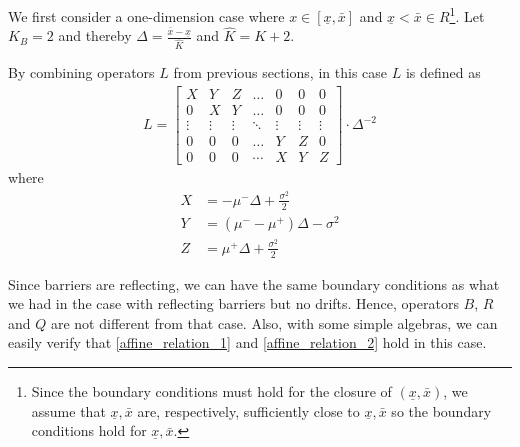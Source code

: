 \documentclass[11pt]{article}
\begin{document}
We first consider a one-dimension case where $x\in [\underline{\textit{\~{x}}}, \bar{\textit{\~{x}}}]$ and $\underline{\textit{\~{x}}} < \bar{\textit{\~{x}}} \in R$\footnote{Since the boundary conditions must hold for the closure of $(\underline{x},\bar{x})$, we assume that $\underline{\textit{\~{x}}}, \bar{\textit{\~{x}}}$ are, respectively, sufficiently close to $\underline{x}, \bar{x}$ so the boundary conditions hold for $\underline{\textit{\~{x}}}, \bar{\textit{\~{x}}}$.}. Let $K_B = 2$ and thereby $\Delta  = \frac{\bar{\textit{\~{x}}} - \underline{\textit{\~{x}}}}{\hat{K}}$ and $\hat{K} = K+2$. 

By combining operators $L$ from previous sections, in this case $L$ is defined as
\begin{align}
L = \begin{bmatrix}
X&Y&Z&\dots&0&0&0\\
0&X&Y&\dots&0&0&0\\
\vdots&\vdots&\vdots&\ddots&\vdots&\vdots&\vdots\\
0&0&0&\dots&Y&Z&0\\
0&0&0&\cdots&X&Y&Z
\end{bmatrix}\cdot \Delta^{-2}\nonumber
\end{align}
where
\begin{align*}
X &= -\mu^-\Delta+\frac{\sigma^2}{2}\\
Y &= (\mu^--\mu^+)\Delta-\sigma^2\\
Z &=\mu^+\Delta+\frac{\sigma^2}{2}
\end{align*}

Since barriers are reflecting, we can have the same boundary conditions as what we had in the case with reflecting barriers but no drifts. Hence, operators $B$, $R$ and $Q$ are not different from that case. Also, with some simple algebras, we can easily verify that \eqref{affine_relation_1} and \eqref{affine_relation_2} hold in this case.
\end{document}
